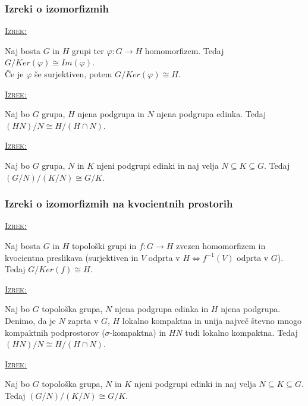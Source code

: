 \documentclass[a4paper, 12pt]{beamer}
\newenvironment{matematika}[1]{
\textcolor{bostonuniversityred}{\underline{\textsc{#1:}}}
}{
}
\begin{document}
\begin{frame}
\frametitle{Izreki o izomorfizmih}
\begin{matematika}{Izrek}
Naj bosta $G$ in $H$ grupi ter $\varphi: G \to H$ homomorfizem. Tedaj $G/Ker(\varphi) \cong Im(\varphi)$. \\
Če je $\varphi$ še surjektiven, potem $G/Ker(\varphi) \cong H$.
\end{matematika}
\newline

\begin{matematika}{Izrek}
Naj bo $G$ grupa, $H$ njena podgrupa in $N$ njena podgrupa edinka. Tedaj $(HN)/N \cong H/(H \cap N)$.
\end{matematika}
\newline

\begin{matematika}{Izrek}
Naj bo $G$ grupa, $N$ in $K$ njeni podgrupi edinki in naj velja $N \subseteq K \subseteq G$. Tedaj $(G/N)/(K/N) \cong G/K$.
\end{matematika}
\end{frame}



\begin{frame}
\frametitle{Izreki o izomorfizmih na kvocientnih prostorih}
\begin{matematika}{Izrek}
Naj bosta $G$ in $H$ topološki grupi in $f: G \to H$ zvezen homomorfizem in kvocientna preslikava (surjektiven in $V$ odprta v $H \iff f^{-1}(V)$ odprta v $G$). Tedaj $G/Ker(f) \cong H$.
\end{matematika}
\newline

\begin{matematika}{Izrek}
Naj bo $G$ topološka grupa, $N$ njena podgrupa edinka in $H$ njena podgrupa. Denimo, da je $N$ zaprta v $G$, $H$ lokalno kompaktna in unija največ števno mnogo kompaktnih podprostorov ($\sigma$-kompaktna) in $HN$ tudi lokalno kompaktna. Tedaj $(HN)/N \cong H/(H \cap N)$.
\end{matematika}
\newline

\begin{matematika}{Izrek}
Naj bo $G$ topološka grupa, $N$ in $K$ njeni podgrupi edinki in naj velja $N \subseteq K \subseteq G$. Tedaj $(G/N)/(K/N) \cong G/K$.
\end{matematika}
\end{frame}
\end{document}

